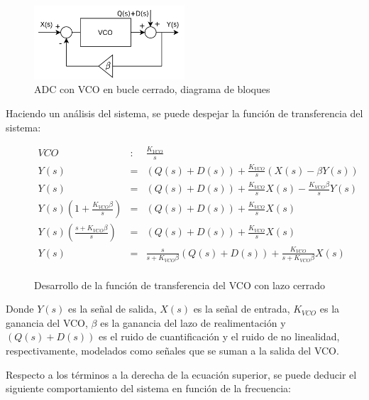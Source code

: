 \documentclass[12pt]{report} %
\begin{document}
	\begin{figure}[H]
		\includegraphics[width=0.5\textwidth]{vco-diagram-closed-loop-with-D.png}
		\caption[ADC con VCO en bucle abierto, diagrama de bloques]{ADC con VCO en bucle cerrado, diagrama de bloques}
		\label{fig:vco-diagram-closed-loop-with-D.png}
	\end{figure}
	
	Haciendo un análisis del sistema, se puede despejar la función de transferencia del sistema:
	
	\begin{figure}[H]
		\caption{Desarrollo de la función de transferencia del VCO con lazo cerrado}
		\label{vco-closed-loop-s}
		\begin{equation}
		\begin{array}{lcl}
		VCO & : & \frac{K_{VCO}}{s} \\
		Y(s) &=& ( Q(s) + D(s) ) + \frac{K_{VCO}}{s}(X(s) - \beta Y(s) ) \\
		Y(s) &=& ( Q(s) + D(s) ) + \frac{K_{VCO}}{s}X(s) - \frac{K_{VCO} \beta}{s}Y(s) \\
		Y(s) (1 + \frac{K_{VCO}\beta}{s}) &=& ( Q(s) + D(s) ) + \frac{K_{VCO}}{s}X(s) \\
		Y(s) (\frac{s + K_{VCO}\beta}{s}) &=& ( Q(s) + D(s) ) + \frac{K_{VCO}}{s}X(s) \\
		Y(s) &=& \frac{s}{s + K_{VCO}\beta}( Q(s) + D(s) ) + \frac{K_{VCO}}{s + K_{VCO}\beta}X(s) \\
		\end{array}
		\end{equation}
	\end{figure}
	
	Donde $Y(s)$ es la señal de salida, $X(s)$ es la señal de entrada, $K_{VCO}$ es la ganancia del VCO, $\beta$ es la ganancia del lazo de realimentación y $( Q(s) + D(s) )$ es el ruido de cuantificación y el ruido de no linealidad, respectivamente, modelados como señales que se suman a la salida del VCO.
	
	Respecto a los términos a la derecha de la ecuación superior, se puede deducir el siguiente comportamiento del sistema en función de la frecuencia:
	
\end{document}

